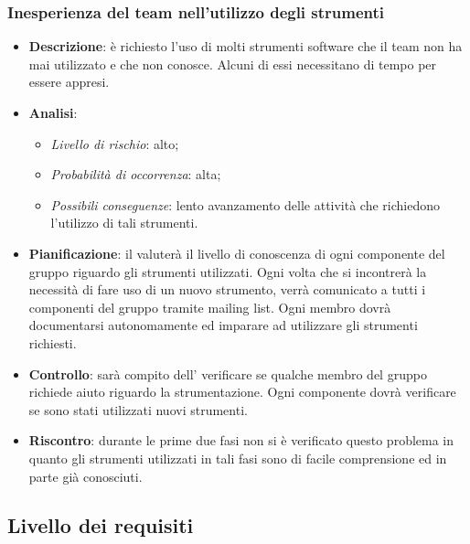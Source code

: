 		\subsubsection{Inesperienza del team nell'utilizzo degli strumenti}
			\begin{itemize}
				\item \textbf{Descrizione}: è richiesto l'uso di molti strumenti software che il team non ha mai utilizzato e che non conosce. Alcuni di essi necessitano di tempo per essere appresi.
				\item \textbf{Analisi}:
				\begin{itemize}
					\item \textit{Livello di rischio}: alto;
					\item \textit{Probabilità di occorrenza}: alta;
					\item \textit{Possibili conseguenze}: lento avanzamento delle attività che richiedono l'utilizzo di tali strumenti.
				\end{itemize}
				\item \textbf{Pianificazione}: il  valuterà il livello di conoscenza di ogni componente del gruppo riguardo gli strumenti utilizzati. Ogni volta che si incontrerà la necessità di fare uso di un nuovo strumento, verrà comunicato a tutti i componenti del gruppo tramite mailing list. Ogni membro dovrà documentarsi autonomamente ed imparare ad utilizzare gli strumenti richiesti.
				\item \textbf{Controllo}: sarà compito dell' verificare se qualche membro del gruppo richiede aiuto riguardo la strumentazione. Ogni componente dovrà verificare se sono stati utilizzati nuovi strumenti.
				\item \textbf{Riscontro}: durante le prime due fasi non si è verificato questo problema in quanto gli strumenti utilizzati in tali fasi sono di facile comprensione ed in parte già conosciuti.
			\end{itemize}
	\subsection{Livello dei requisiti}

